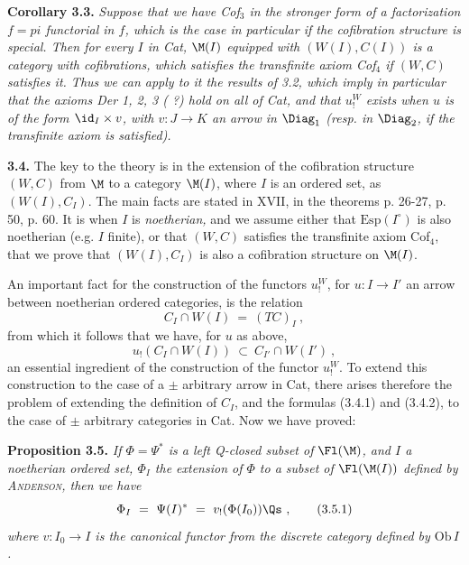 \textbf{Corollary 3.3.} \textit{Suppose that we have Cof$_3$ in the stronger form of a factorization
$f=pi$ \textup{functorial} in $f$, which is the case in particular if the cofibration structure is special. Then for every $I$ in \textup{Cat}, $\M(I)$ equipped with $(W(I),C(I))$ is a category with cofibrations, which satisfies the transfinite axiom Cof$_4$ if $(W,C)$ satisfies it. Thus we can apply to it the results of \textup{3.2}, which imply in particular that the axioms Der 1, 2, 3 ( ?) hold on all of \textup{Cat}, and that $u^{W}_{!}$ exists when $u$ is of the form $\id_I\times v$, with $v : J\longrightarrow K$ an arrow in \textup{$\Diag_1$} (resp. in \textup{$\Diag_2$}, if the transfinite axiom is satisfied).}

\textbf{3.4.} The key to the theory is in the extension of the cofibration structure $(W,C)$ from $\M$ to a category $\M(I)$, where $I$ is an ordered set, as $(W(I),C_I)$. The main facts are stated in XVII, in the theorems p. 26-27, p. 50, p. 60. It is when $I$ is \textit{noetherian,} and we assume either that $\mathrm{Esp}(I^{\circ})$ is also noetherian (e.g. $I$ finite), or that $(W,C)$ satisfies the transfinite axiom Cof$_4$, that we prove that $(W(I),C_I)$ is also a cofibration structure on $\M(I)$.

An important fact for the construction of the functors $u^{W}_{!}$, for $u : I\longrightarrow I'$ an arrow between noetherian ordered categories, is the relation
\[
C_I\cap W(I) \ = \ (TC)_I \ , \tag*{(3.4.1)}
\]
from which it follows that we have, for $u$ as above,
\[
u_!(C_I\cap W(I)) \ \subset\ C_{I'}\cap W(I') \ , \tag*{(3.4.2)}
\]
an essential ingredient of the construction of the functor $u^{W}_{!}$. To extend this construction to the case of a $\pm$ arbitrary arrow in Cat, there arises therefore the problem of extending the definition of $C_I$, and the formulas (3.4.1) and (3.4.2), to the case of $\pm$ arbitrary categories in Cat. Now we have proved:

\textbf{Proposition 3.5.} \textit{If $\Phi=\Psi^*$ is a left \textup{Q-closed} subset of \textup{$\Fl(\M)$}, and $I$ a noetherian ordered set, $\Phi_I$ the extension of $\Phi$ to a subset of \textup{$\Fl(\M(I))$} defined by \textup{\textsc{Anderson}}, then we have}
\[
\Phi_I \ = \ \Psi(I)^* \ = \ v_!(\Phi(I_0))\Qs \ , \tag*{(3.5.1)}
\]
\textit{where $v : I_0\longrightarrow I$ is the canonical functor from the discrete category defined by \textup{$\mathrm{Ob}\,I$}.}


